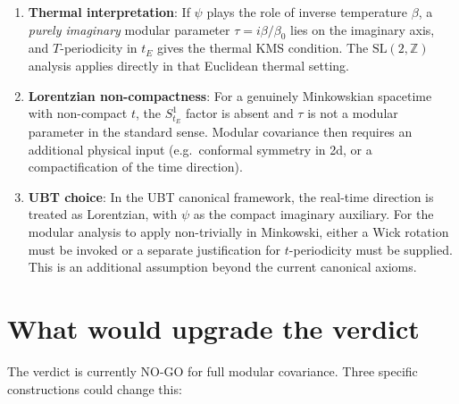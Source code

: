 \documentclass[12pt,a4paper]{article}
\theoremstyle{definition}
\theoremstyle{remark}
\newcommand{\SL}{\mathrm{SL}}
\newcommand{\ZZ}{\mathbb{Z}}
\begin{document}
\begin{enumerate}[leftmargin=*]
\item \textbf{Thermal interpretation}: If $\psi$ plays the role of
  inverse temperature $\beta$, a \emph{purely imaginary} modular parameter
  $\tau=i\beta/\beta_0$ lies on the imaginary axis, and $T$-periodicity in
  $t_E$ gives the thermal KMS condition.  The $\SL(2,\ZZ)$ analysis applies
  directly in that Euclidean thermal setting.

\item \textbf{Lorentzian non-compactness}: For a genuinely Minkowskian spacetime
  with non-compact $t$, the $S^1_{t_E}$ factor is absent and $\tau$ is not
  a modular parameter in the standard sense.  Modular covariance then
  requires an additional physical input (e.g.\ conformal symmetry in 2d,
  or a compactification of the time direction).

\item \textbf{UBT choice}: In the UBT canonical framework, the real-time
  direction is treated as Lorentzian, with $\psi$ as the compact imaginary
  auxiliary.  For the modular analysis to apply non-trivially in Minkowski,
  either a Wick rotation must be invoked or a separate justification for
  $t$-periodicity must be supplied.  This is an additional assumption beyond
  the current canonical axioms.
\end{enumerate}

\section{What would upgrade the verdict}
\label{sec:upgrade}

The verdict is currently NO-GO for full modular covariance.  Three specific
constructions could change this:
\end{document}
